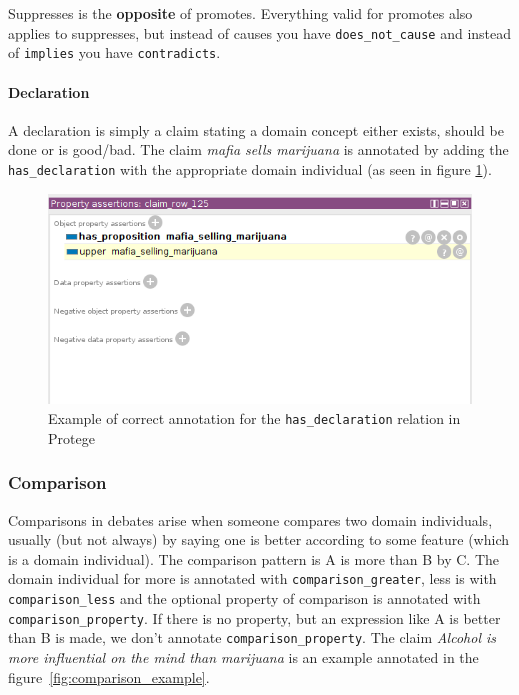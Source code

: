 Suppresses is the \textbf{opposite} of promotes. Everything valid for promotes
also applies to suppresses, but instead of causes you have
\texttt{does\_not\_cause} and instead of \texttt{implies} you have \texttt{contradicts}.

\paragraph{Declaration}

A declaration is simply a claim stating a domain concept either exists, should
be done or is good/bad. The claim \textit{mafia sells marijuana} is annotated by adding
the \texttt{has\_declaration} with the appropriate domain individual (as seen in figure
\ref{fig:declaration_example}). 

\begin{figure}
	\includegraphics[scale=0.8]{has_declaration.png}
	\caption{Example of correct annotation for the \texttt{has\_declaration} relation in Protege}
\label{fig:declaration_example}
\end{figure}

\subsubsection*{Comparison}

Comparisons in debates arise when someone compares two domain individuals,
usually (but not always) by saying one is better according to some feature
(which is a domain individual). The comparison pattern is A is more than B by
C. The domain individual for more is annotated with
\texttt{comparison\_greater}, less is with \texttt{comparison\_less} and the
optional property of comparison is annotated with
\texttt{comparison\_property}. If there is no property, but an expression like
A is better than B is made, we don’t annotate \texttt{comparison\_property}.
The claim \textit{Alcohol is more influential on the mind than marijuana} is an
example annotated in the figure~\ref{fig:comparison_example}.

